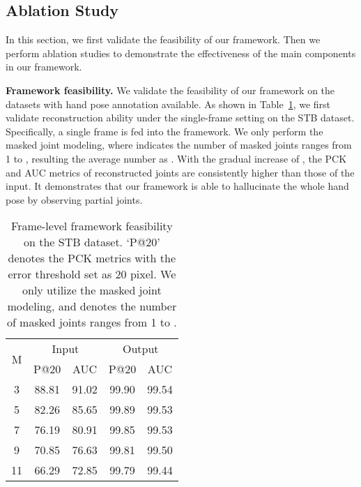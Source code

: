 \documentclass[10pt,twocolumn,letterpaper]{article}
\begin{document}
\subsection{Ablation Study}
In this section, we first validate the feasibility of our framework.
Then we perform ablation studies to demonstrate the effectiveness of the main components in our framework.


\noindent \textbf{Framework feasibility.}
We validate the feasibility of our framework on the datasets with hand pose annotation available.
As shown in Table~\ref{STB}, we first validate reconstruction ability under the single-frame setting on the STB dataset.
Specifically, a single frame is fed into the framework.
We only perform the masked joint modeling, where  indicates the number of masked joints ranges from 1 to , resulting the average number as .
With the gradual increase of , the PCK and AUC metrics of reconstructed joints are consistently higher than those of the input.
It demonstrates that our framework is able to hallucinate the whole hand pose by observing partial joints.



\begin{table}
\small
\tabcolsep=11pt
\begin{center}
\begin{tabular}{c|cc|cc}
\hline
\multirow{2}{*}{M}  & \multicolumn{2}{c|}{Input} & \multicolumn{2}{c}{Output} \\
   & P@20  & AUC   & P@20  & AUC \\ \hline \hline
3  & 88.81 & 91.02 & 99.90 & 99.54  \\
5  & 82.26 & 85.65 & 99.89 & 99.53  \\
7  & 76.19 & 80.91 & 99.85 & 99.53  \\
9  & 70.85 & 76.63 & 99.81 & 99.50  \\
11 & 66.29 & 72.85 & 99.79 & 99.44  \\ \hline
\end{tabular}
\end{center}
\caption{Frame-level framework feasibility on the STB dataset. `P@20' denotes the PCK metrics with the error threshold set as 20 pixel. We only utilize the masked joint modeling, and  denotes the number of masked joints ranges from 1 to .}
\label{STB}
\vspace{-0.3cm}
\end{table}
\end{document}

